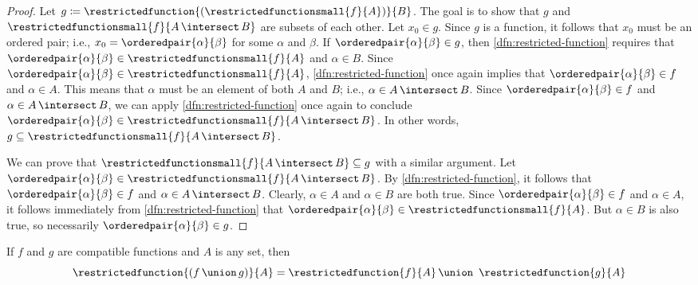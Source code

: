 \begin{proof}
    Let \( g \coloneq  \restrictedfunction{ ( \restrictedfunctionsmall{f}{A} ) }{B} \). The goal is to show that \( g \) and \( \restrictedfunctionsmall{f}{A \,{\intersect}\, B} \)
    are subsets of each other.
    Let \( x_{0} \in g \). Since \( g \) is a function, it follows that \( x_{0} \) must be an ordered pair; i.e., \( x_{0} = \orderedpair{\alpha}{\beta} \) for some
    \( \alpha \) and \( \beta \). If \( \orderedpair{\alpha}{\beta} \in g \), then \cref{dfn:restricted-function} requires that \( \orderedpair{\alpha}{\beta} \in \restrictedfunctionsmall{f}{A} \) and \( \alpha \in B \). Since \( \orderedpair{\alpha}{\beta} \in \restrictedfunctionsmall{f}{A} \), \cref{dfn:restricted-function} once again
    implies that \( \orderedpair{\alpha}{\beta} \in f \) and \( \alpha \in A \).
    This means that \( \alpha \) must be an element of both \( A \) and \( B \); i.e., \( \alpha \in A \,{\intersect}\, B \).
    Since \( \orderedpair{\alpha}{\beta} \in f \) and \( \alpha \in A \,{\intersect}\, B\), we can apply \cref{dfn:restricted-function} once again to conclude
    \( \orderedpair{\alpha}{\beta} \in \restrictedfunctionsmall{f}{A \,{\intersect}\, B} \).
    In other words, \( g \subseteq \restrictedfunctionsmall{f}{A \,{\intersect}\, B} \).

    \vspace{0.3cm}
    \noindent
    We can prove that \( \restrictedfunctionsmall{f}{A \,{\intersect}\, B} \subseteq g \) with a similar argument.
    Let \( \orderedpair{\alpha}{\beta} \in \restrictedfunctionsmall{f}{A \,{\intersect}\, B} \).
    By \cref{dfn:restricted-function}, it follows that \( \orderedpair{\alpha}{\beta} \in f \) and \( \alpha \in A \,{\intersect}\, B \).
    Clearly, \( \alpha \in A \) and \( \alpha \in B \) are both true.
    Since \( \orderedpair{\alpha}{\beta} \in f \) and \( \alpha \in A \), it follows immediately from \cref{dfn:restricted-function}
    that \( \orderedpair{\alpha}{\beta} \in \restrictedfunctionsmall{f}{A} \). But \( \alpha \in B \) is also true, so necessarily
    \( \orderedpair{\alpha}{\beta} \in g \).
\end{proof}

\begin{thm}
     \label{thm:restricted-function-of-the-union-of-two-compatible-functions}
    If \( f \) and \( g \) are compatible functions and \( A \) is any set, then
    \begin{equation*}
        \restrictedfunction{\mleft( f \,{\union}\, g \mright)}{A} = \restrictedfunction{f}{A} \,{\union}\,\,\, \restrictedfunction{g}{A}
    \end{equation*}
\end{thm}

